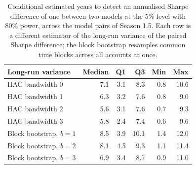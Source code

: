 \begin{table}[ht]
\centering
\small
\caption{Conditional estimated years to detect an annualised Sharpe difference of one between two models at the 5\% level with 80\% power, across the \alShPairs{} model pairs of Season 1.5. Each row is a different estimator of the long-run variance of the paired Sharpe difference; the block bootstrap resamples common time blocks across all accounts at once.}
\label{tab:horizon}
\begin{tabular}{lrrrrr}
\toprule
Long-run variance & Median & Q1 & Q3 & Min & Max \\
\midrule
HAC bandwidth 0 & 7.1 & 3.1 & 8.3 & 0.8 & 10.6 \\
HAC bandwidth 1 & 6.3 & 3.2 & 7.6 & 0.8 & 9.0 \\
HAC bandwidth 2 & 5.6 & 3.1 & 7.6 & 0.7 & 9.3 \\
HAC bandwidth 3 & 5.8 & 2.4 & 7.4 & 0.6 & 9.6 \\
Block bootstrap, $b=1$ & 8.5 & 3.9 & 10.1 & 1.4 & 12.0 \\
Block bootstrap, $b=2$ & 8.1 & 4.5 & 9.3 & 1.1 & 11.4 \\
Block bootstrap, $b=3$ & 6.9 & 3.4 & 8.7 & 0.9 & 11.0 \\
\bottomrule
\end{tabular}
\end{table}
